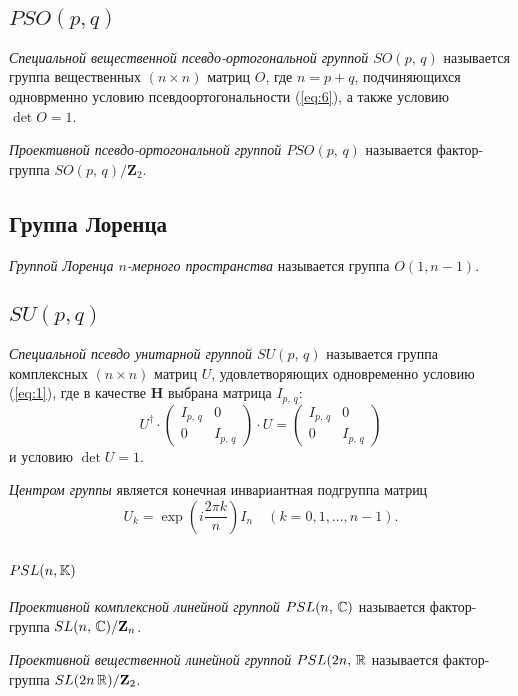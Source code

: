 \documentclass[a4paper,12pt]{article}
\begin{document}
\subsection{$PSO(p, q)$ }
\begin{dfn}
	\emph{Специальной вещественной псевдо-ортогональной группой $SO(p,\,q)$}
	называется
	группа вещественных $(n \times n)$ матриц $O$, где $n=p+q$, подчиняющихся
	одноврменно условию псевдоортогональности (\ref{eq:6}), а также
	условию $\det O =1$.
\end{dfn}

\begin{dfn}
	\emph{Проективной псевдо-ортогональной группой $PSO(p,\,q)$}
	называется фактор-группа $SO(p,\,q) / \mathbf{Z}_2$.
\end{dfn}
\subsection{Группа Лоренца}
\begin{dfn}
	\emph{Группой Лоренца $n$-мерного пространства}
	называется группа $O(1,n-1)$.
\end{dfn}
\subsection{$SU(p, q)$ }
\begin{dfn}
	\emph{Специальной псевдо унитарной группой $SU(p,\,q)$} называется
	группа комплексных $(n \times n)$ матриц $U$, удовлетворяющих
	одновременно условию (\ref{eq:1}),
	где в качестве $\mathbf{H}$ выбрана матрица $I_{p,\,q}$:
\begin{equation}
	U^\dag  \cdot \begin{pmatrix} I_{p,\,q} & 0 \\ 0 & I_{p,\,q}
	\end{pmatrix} \cdot U= \begin{pmatrix} I_{p,\,q} & 0 \\  0 & I_{p,\,q}
\end{pmatrix} 
\end{equation}
и условию  $\det U =1$.
\end{dfn}
\emph{Центром группы} является конечная инвариантная подгруппа матриц
\begin{equation}
	U_k =\exp \left( i \frac{2 \pi k}{n} \right) I_n \quad (k = 0, 1, \ldots,
	n-1)
.\end{equation}
\subsection{$PSL(n, \mathbb{K})$ }
\begin{dfn}
	\emph{Проективной комплексной линейной группой $PSL(n,\,\mathbb{C})$}
	называется фактор-группа $SL(n,\,\mathbb{C}) / \mathbf{Z}_n$.
\end{dfn}
\begin{dfn}
	\emph{Проективной вещественной линейной группой $PSL(2n,\,\mathbb{R}$}
	называется фактор-группа $SL(2n\,\mathbb{R})/\mathbf{Z}_2$.
\end{dfn}
\end{document}
